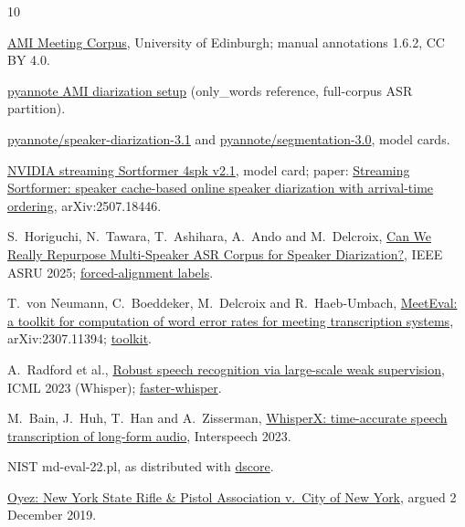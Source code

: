 \documentclass[11pt,a4paper]{article}
\begin{document}
\begin{thebibliography}{10}
\small

\href{https://groups.inf.ed.ac.uk/ami/corpus/}{AMI Meeting Corpus}, University of Edinburgh; manual annotations 1.6.2, CC BY 4.0.

\href{https://github.com/pyannote/AMI-diarization-setup}{pyannote AMI diarization setup} (only\_words reference, full-corpus ASR partition).

\href{https://huggingface.co/pyannote/speaker-diarization-3.1}{pyannote/speaker-diarization-3.1} and \href{https://huggingface.co/pyannote/segmentation-3.0}{pyannote/segmentation-3.0}, model cards.

\href{https://huggingface.co/nvidia/diar_streaming_sortformer_4spk-v2.1}{NVIDIA streaming Sortformer 4spk v2.1}, model card; paper: \href{https://arxiv.org/abs/2507.18446}{Streaming Sortformer: speaker cache-based online speaker diarization with arrival-time ordering}, arXiv:2507.18446.

S.~Horiguchi, N.~Tawara, T.~Ashihara, A.~Ando and M.~Delcroix, \href{https://arxiv.org/abs/2507.09226}{Can We Really Repurpose Multi-Speaker ASR Corpus for Speaker Diarization?}, IEEE ASRU 2025; \href{https://github.com/nttcslab-sp/diar-forced-alignment}{forced-alignment labels}.

T.~von Neumann, C.~Boeddeker, M.~Delcroix and R.~Haeb-Umbach, \href{https://arxiv.org/abs/2307.11394}{MeetEval: a toolkit for computation of word error rates for meeting transcription systems}, arXiv:2307.11394; \href{https://github.com/fgnt/meeteval}{toolkit}.

A.~Radford et al., \href{https://arxiv.org/abs/2212.04356}{Robust speech recognition via large-scale weak supervision}, ICML 2023 (Whisper); \href{https://github.com/SYSTRAN/faster-whisper}{faster-whisper}.

M.~Bain, J.~Huh, T.~Han and A.~Zisserman, \href{https://arxiv.org/abs/2303.00747}{WhisperX: time-accurate speech transcription of long-form audio}, Interspeech 2023.

NIST md-eval-22.pl, as distributed with \href{https://github.com/nryant/dscore}{dscore}.

\href{https://www.oyez.org/cases/2019/18-280}{Oyez: New York State Rifle \& Pistol Association v.\ City of New York}, argued 2 December 2019.

\end{thebibliography}
\end{document}
